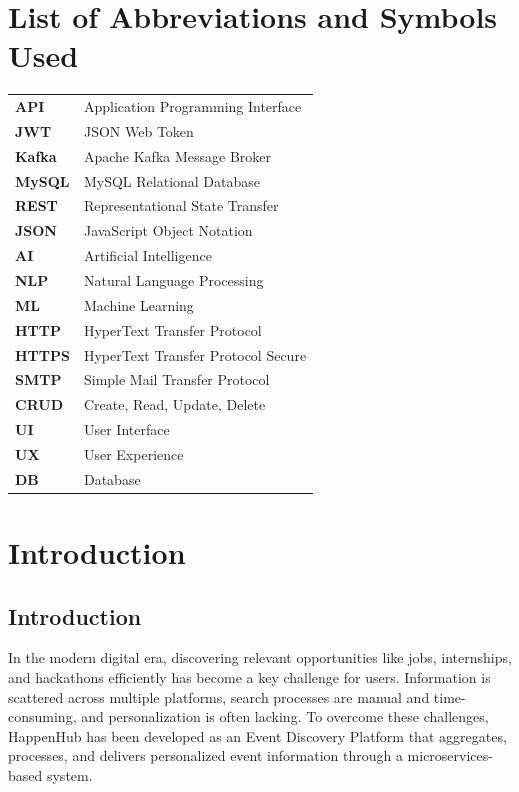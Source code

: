 \documentclass[12pt,a4paper]{report}
\begin{document}
\chapter*{List of Abbreviations and Symbols Used}

\begin{tabular}{p{3cm}p{10cm}}
    \textbf{API}   & Application Programming Interface  \\
    \textbf{JWT}   & JSON Web Token             \\
    \textbf{Kafka} & Apache Kafka Message Broker       \\
    \textbf{MySQL} & MySQL Relational Database       \\
    \textbf{REST}  & Representational State Transfer     \\
    \textbf{JSON}  & JavaScript Object Notation        \\
    \textbf{AI}    & Artificial Intelligence           \\
    \textbf{NLP}   & Natural Language Processing       \\
    \textbf{ML}    & Machine Learning            \\
    \textbf{HTTP}  & HyperText Transfer Protocol       \\
    \textbf{HTTPS} & HyperText Transfer Protocol Secure \\
    \textbf{SMTP}  & Simple Mail Transfer Protocol     \\
    \textbf{CRUD}  & Create, Read, Update, Delete        \\
    \textbf{UI}    & User Interface                \\
    \textbf{UX}    & User Experience               \\
    \textbf{DB}    & Database                  \\
\end{tabular}

\clearpage

\pagestyle{main}

\chapter{Introduction}
\section{Introduction}
In the modern digital era, discovering relevant opportunities like jobs,
internships, and hackathons efficiently has become a key challenge for users.
Information is scattered across multiple platforms, search processes are manual
and time-consuming, and personalization is often lacking. To overcome these
challenges, HappenHub has been developed as an Event Discovery Platform that
aggregates, processes, and delivers personalized event information through a
microservices-based system.
\end{document}
